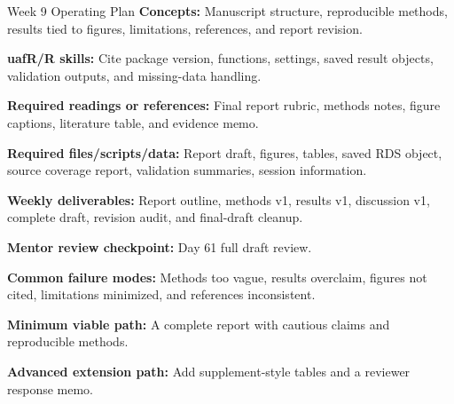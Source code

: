 \begin{checklistbox}{Week 9 Operating Plan}
\textbf{Concepts:} Manuscript structure, reproducible methods, results tied to figures, limitations, references, and report revision.

\textbf{uafR/R skills:} Cite package version, functions, settings, saved result objects, validation outputs, and missing-data handling.

\textbf{Required readings or references:} Final report rubric, methods notes, figure captions, literature table, and evidence memo.

\textbf{Required files/scripts/data:} Report draft, figures, tables, saved RDS object, source coverage report, validation summaries, session information.

\textbf{Weekly deliverables:} Report outline, methods v1, results v1, discussion v1, complete draft, revision audit, and final-draft cleanup.

\textbf{Mentor review checkpoint:} Day 61 full draft review.

\textbf{Common failure modes:} Methods too vague, results overclaim, figures not cited, limitations minimized, and references inconsistent.

\textbf{Minimum viable path:} A complete report with cautious claims and reproducible methods.

\textbf{Advanced extension path:} Add supplement-style tables and a reviewer response memo.
\end{checklistbox}

